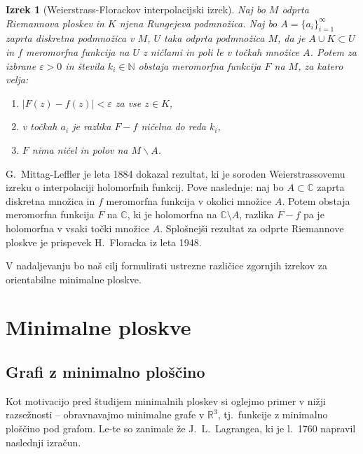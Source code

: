\documentclass[12pt,a4paper,twoside]{article}
\theoremstyle{definition} %
\theoremstyle{plain} %
\newtheorem{izrek}[definicija]{Izrek}
\numberwithin{equation}{section}  %
\newcommand{\R}{\mathbb R}
\newcommand{\N}{\mathbb N}
\newcommand{\C}{\mathbb C}
\begin{document}
\begin{izrek} [Weierstrass-Florackov interpolacijski izrek] \label{izr:Weierstrass-Florack}
Naj bo $M$ odprta Riemannova ploskev in $K$ njena Rungejeva podmnožica. Naj bo $A = \{ a_i \}_{i=1}^{\infty}$ zaprta diskretna podmnožica v $M$, $U$ taka odprta podmnožica $M$, da je $A \cup K \subset U$ in $f$ meromorfna funkcija na $U$ z ničlami in poli le v točkah množice $A$.
Potem za izbrane $\varepsilon > 0$ in števila $k_{i} \in \N$ obstaja meromorfna funkcija $F$ na $M$, za katero velja:
\begin{enumerate}
\item $|F(z) - f(z)| < \varepsilon$ za vse $z \in K$,
\item v točkah $a_i$ je razlika $F-f$ ničelna do reda $k_i$,
\item $F$ nima ničel in polov na $M \backslash A$.
\end{enumerate} 
\end{izrek}

G.~Mittag-Leffler je leta 1884 dokazal rezultat, ki je soroden Weierstrassovemu izreku o interpolaciji holomorfnih funkcij. Pove naslednje:
naj bo $A \subset \C$ zaprta diskretna množica in $f$ meromorfna funkcija v okolici množice $A$. Potem obstaja meromorfna funkcija $F$ na $\C$, ki je holomorfna na $\C \setminus A$, razlika $F-f$ pa je holomorfna v vsaki točki množice $A$. \newline
Splošnejši rezultat za odprte Riemannove ploskve je prispevek H.~Floracka iz leta 1948. \newline

V nadaljevanju bo naš cilj formulirati ustrezne različice zgornjih izrekov za orientabilne minimalne ploskve.

\section{Minimalne ploskve}

\subsection{Grafi z minimalno ploščino}
%
Kot motivacijo pred študijem minimalnih ploskev si oglejmo primer v nižji razsežnosti -- obravnavajmo minimalne grafe v $\R^3$, tj.~funkcije z minimalno ploščino pod grafom. Le-te so zanimale že J.~L.~Lagrangea, ki je l.~1760 napravil naslednji izračun. 
\end{document}
